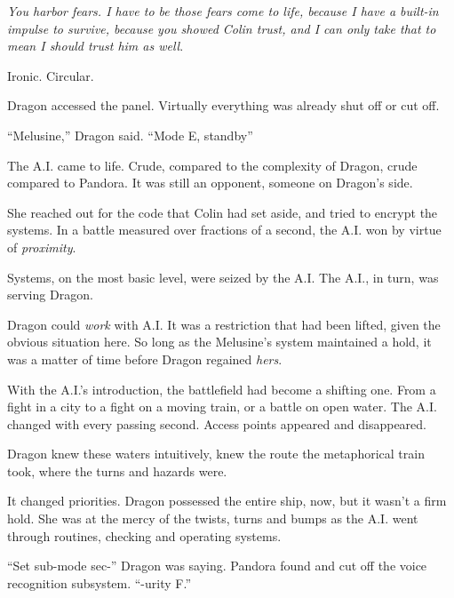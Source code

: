 \emph{You harbor fears.  I have to be those fears come to life, because I have a built-in impulse to survive, because you showed Colin trust, and I can only take that to mean I should trust him as well}.



Ironic.  Circular.



Dragon accessed the panel.  Virtually everything was already shut off or cut off.



``Melusine,'' Dragon said.  ``Mode E, standby''



The A.I. came to life.  Crude, compared to the complexity of Dragon, crude compared to Pandora.  It was still an opponent, someone on Dragon's side.



She reached out for the code that Colin had set aside, and tried to encrypt the systems.  In a battle measured over fractions of a second, the A.I. won by virtue of \emph{proximity}.



Systems, on the most basic level, were seized by the A.I.  The A.I., in turn, was serving Dragon.



Dragon could \emph{work} with A.I.  It was a restriction that had been lifted, given the obvious situation here.  So long as the Melusine's system maintained a hold, it was a matter of time before Dragon regained \emph{hers}.



With the A.I.'s introduction, the battlefield had become a shifting one.  From a fight in a city to a fight on a moving train, or a battle on open water.  The A.I. changed with every passing second.  Access points appeared and disappeared.



Dragon knew these waters intuitively, knew the route the metaphorical train took, where the turns and hazards were.



It changed priorities.  Dragon possessed the entire ship, now, but it wasn't a firm hold.  She was at the mercy of the twists, turns and bumps as the A.I. went through routines, checking and operating systems.



``Set sub-mode sec-'' Dragon was saying.  Pandora found and cut off the voice recognition subsystem.  ``-urity F.''



